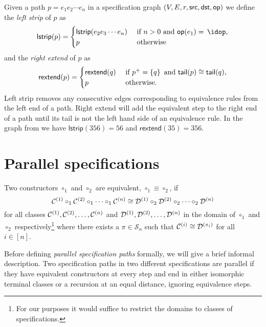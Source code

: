 Given a path $p = e_1e_2\dotsm e_n$ in a specification graph $(V,E,r,\textsf{src},\textsf{dst},\textsf{op})$ we define the \emph{left strip} of $p$ as
\[
     \textsf{lstrip}(p) = \begin{cases} \textsf{lstrip}(e_2e_3\dotsm e_n) & \text{ if } n > 0 \text{ and } \op(e_1) =\,\idop,\\
     p & \text{ otherwise}
     \end{cases}
\]
and the \emph{right extend} of $p$ as
\[
    \textsf{rextend}(p) = \begin{cases}
        \textsf{rextend}(q) & \text{ if } p^+ = \left\{q\right\} \text{ and } \textsf{tail}(p) \cong \textsf{tail}(q),\\
        p & \text{ otherwise}.
    \end{cases}
\]
Left strip removes any consecutive edges corresponding to equivalence rules from the left end of a path. Right extend will add the equivalent step to the right end of a path until its tail is not the left hand side of an equivalence rule. In the graph from  we have $\textsf{lstrip}(356) = 56$ and $\textsf{rextend}(35) = 356$.

\section{Parallel specifications}
\begin{definition}
Two constructors $\circ_1$ and $\circ_2$ are equivalent, $\circ_1 \equiv \circ_2$, if
\[
    \mathcal{C}^{\left(1\right)} \circ_1 \mathcal{C}^{\left(2\right)} \circ_1 \dotsm \circ_1 \mathcal{C}^{\left(n\right)} \cong \mathcal{D}^{\left(1\right)} \circ_2 \mathcal{D}^{\left(2\right)} \circ_2 \dotsm \circ_2 \mathcal{D}^{\left(n\right)}
\]
for all classes $\mathcal{C}^{\left(1\right)},\mathcal{C}^{\left(2\right)},\dotsc,\mathcal{C}^{\left(n\right)}$ and $\mathcal{D}^{\left(1\right)},\mathcal{D}^{\left(2\right)},\dotsc,\mathcal{D}^{\left(n\right)}$ in the domain of $\circ_1$ and $\circ_2$ respectively\footnote{For our purposes it would suffice to restrict the domains to classes of specifications.} where there exists a $\pi\in\mathcal{S}_n$ such that $\mathcal{C}^{\left(i\right)}\cong\mathcal{D}^{\left(\pi_i\right)}$ for all $i\in[n]$.
\end{definition}

Before defining \emph{parallel specification paths} formally, we will give a brief informal description. Two specification paths in two different specifications are parallel if they have equivalent constructors at every step and end in either isomorphic terminal classes or a recursion at an equal distance, ignoring equivalence steps.

